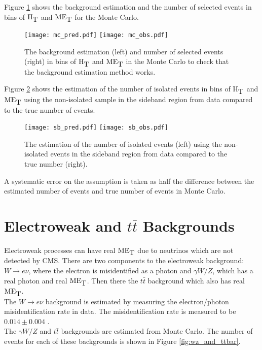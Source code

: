 Figure \ref{fig:Bkgd_Est_MC} shows the background estimation and the number of
selected events in bins of $\mbox{H}_{\mbox{T}}$ and $\mbox{ME}_{\mbox{T}}$ for the Monte Carlo. \\

\begin{figure}
\texttt{[image: mc\_pred.pdf]}
\texttt{[image: mc\_obs.pdf]}
\caption{The background estimation (left) and number of selected events (right) 
in bins of $\mbox{H}_{\mbox{T}}$ and $\mbox{ME}_{\mbox{T}}$ in the Monte Carlo to check that the background
estimation method works.}
\label{fig:Bkgd_Est_MC}
\end{figure}

Figure \ref{fig:Bkgd_Est_Sideband} shows the estimation of the number of
isolated events in bins of $\mbox{H}_{\mbox{T}}$ and $\mbox{ME}_{\mbox{T}}$ using the non-isolated sample in the
sideband region from data compared to the true number of events. \\

\begin{figure}
\texttt{[image: sb\_pred.pdf]}
\texttt{[image: sb\_obs.pdf]}
\caption{The estimation of the number of isolated events (left) using the
non-isolated events in the sideband region from data compared to the true number
(right).}
\label{fig:Bkgd_Est_Sideband}
\end{figure}

A systematic error on the assumption is taken as half the difference between the
estimated number of events and true number of events in Monte Carlo.

\section{Electroweak and $t\bar{t}$ Backgrounds}

Electroweak processes can have real $\mbox{ME}_{\mbox{T}}$ due to neutrinos which are not
detected by CMS. There are two components to the electroweak background:
$W\rightarrow e\nu$, where the electron is misidentified as a photon and 
$\gamma W/Z$, which has a real photon and real $\mbox{ME}_{\mbox{T}}$. Then there the $t\bar{t}$
background which also has real $\mbox{ME}_{\mbox{T}}$. \\

The $W\rightarrow e\nu$ background is estimated by measuring the electron/photon
misidentification rate in data. The misidentification rate is measured to be
$0.014\pm0.004$ \cite{ra3}. \\

The $\gamma W/Z$ and $t\bar{t}$ backgrounds are estimated from Monte Carlo. The
number of events for each of these backgrounds is shown in Figure
\ref{fig:wz_and_ttbar}.

